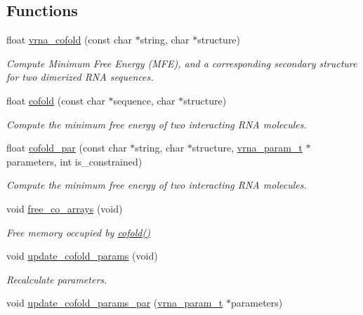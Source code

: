 \subsection*{Functions}
\begin{DoxyCompactItemize}
\item 
float \hyperlink{group__mfe__cofold_ga45515db181f17653ef7ef5487ef36d08}{vrna\-\_\-cofold} (const char $\ast$string, char $\ast$structure)
\begin{DoxyCompactList}\small\item\em Compute Minimum Free Energy (M\-F\-E), and a corresponding secondary structure for two dimerized R\-N\-A sequences. \end{DoxyCompactList}\item 
float \hyperlink{group__mfe__cofold_gabc8517f22cfe70595ee81fc837910d52}{cofold} (const char $\ast$sequence, char $\ast$structure)
\begin{DoxyCompactList}\small\item\em Compute the minimum free energy of two interacting R\-N\-A molecules. \end{DoxyCompactList}\item 
float \hyperlink{group__mfe__cofold_ga7612cfeeb1b793f1e4179b1eb53df1f3}{cofold\-\_\-par} (const char $\ast$string, char $\ast$structure, \hyperlink{group__energy__parameters_ga8a69ca7d787e4fd6079914f5343a1f35}{vrna\-\_\-param\-\_\-t} $\ast$parameters, int is\-\_\-constrained)
\begin{DoxyCompactList}\small\item\em Compute the minimum free energy of two interacting R\-N\-A molecules. \end{DoxyCompactList}\item 
void \hyperlink{group__mfe__cofold_gaafb33d7473eb9af9d1b168ca8761c41a}{free\-\_\-co\-\_\-arrays} (void)
\begin{DoxyCompactList}\small\item\em Free memory occupied by \hyperlink{group__mfe__cofold_gabc8517f22cfe70595ee81fc837910d52}{cofold()} \end{DoxyCompactList}\item 
void \hyperlink{group__mfe__cofold_ga4fcbf34e77b99bfbb2333d2ab0c41a57}{update\-\_\-cofold\-\_\-params} (void)
\begin{DoxyCompactList}\small\item\em Recalculate parameters. \end{DoxyCompactList}\item 
void \hyperlink{group__mfe__cofold_gaaadbd28b4e428710529ab4098fdacad3}{update\-\_\-cofold\-\_\-params\-\_\-par} (\hyperlink{group__energy__parameters_ga8a69ca7d787e4fd6079914f5343a1f35}{vrna\-\_\-param\-\_\-t} $\ast$parameters)

\end{DoxyCompactItemize}
